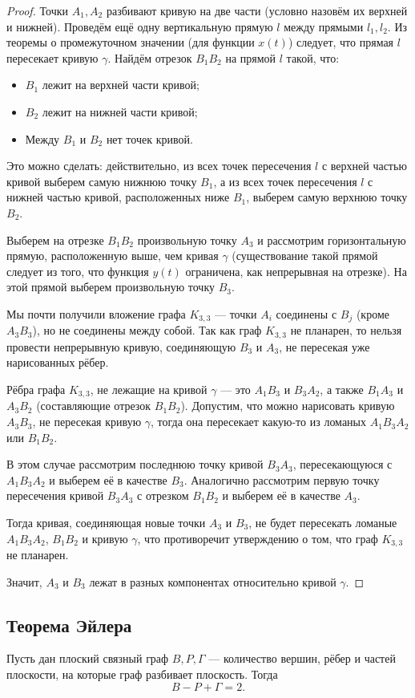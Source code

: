\begin{proof}
    Точки $A_1, A_2$ разбивают кривую на две части (условно назовём их верхней и нижней). Проведём ещё одну вертикальную прямую $l$ между прямыми $l_1, l_2$. Из теоремы о промежуточном значении (для функции $x(t)$) следует, что прямая $l$ пересекает кривую $\gamma$. Найдём отрезок $B_1B_2$ на прямой $l$ такой, что:
    \begin{itemize}
        \item $B_1$ лежит на верхней части кривой;
        \item $B_2$ лежит на нижней части кривой;
        \item Между $B_1$ и $B_2$ нет точек кривой.
    \end{itemize}
    Это можно сделать: действительно, из всех точек пересечения $l$ с верхней частью кривой выберем самую нижнюю точку $B_1$, а из всех точек пересечения $l$ с нижней частью кривой, расположенных ниже $B_1$, выберем самую верхнюю точку $B_2$.

    Выберем на отрезке $B_1B_2$ произвольную точку $A_3$ и рассмотрим горизонтальную прямую, расположенную выше, чем кривая $\gamma$ (существование такой прямой следует из того, что функция $y(t)$ ограничена, как непрерывная на отрезке). На этой прямой выберем произвольную точку $B_3$.

    Мы почти получили вложение графа $K_{3,3}$ — точки $A_i$ соединены с $B_j$ (кроме $A_3B_3$), но не соединены между собой. Так как граф $K_{3,3}$ не планарен, то нельзя провести непрерывную кривую, соединяющую $B_3$ и $A_3$, не пересекая уже нарисованных рёбер.

    Рёбра графа $K_{3,3}$, не лежащие на кривой $\gamma$ — это $A_1B_3$ и $B_3A_2$, а также $B_1A_3$ и $A_3B_2$ (составляющие отрезок $B_1B_2$). Допустим, что можно нарисовать кривую $A_3B_3$, не пересекая кривую $\gamma$, тогда она пересекает какую-то из ломаных $A_1B_3A_2$ или $B_1B_2$.

    В этом случае рассмотрим последнюю точку кривой $B_3A_3$, пересекающуюся с $A_1B_3A_2$ и выберем её в качестве $B_3$. Аналогично рассмотрим первую точку пересечения кривой $B_3A_3$ с отрезком $B_1B_2$ и выберем её в качестве $A_3$.

    Тогда кривая, соединяющая новые точки $A_3$ и $B_3$, не будет пересекать ломаные $A_1B_3A_2$, $B_1B_2$ и кривую $\gamma$, что противоречит утверждению о том, что граф $K_{3,3}$ не планарен.

    Значит, $A_3$ и $B_3$ лежат в разных компонентах относительно кривой $\gamma$.
\end{proof}

\subsection{Теорема Эйлера}
\begin{theorem}[Эйлер]
    Пусть дан плоский связный граф $B, P, \Gamma$ — количество вершин, рёбер и частей плоскости, на которые граф разбивает плоскость. Тогда 
    \begin{equation}
        B - P + \Gamma = 2.
        \label{eyler}
    \end{equation}
\end{theorem}